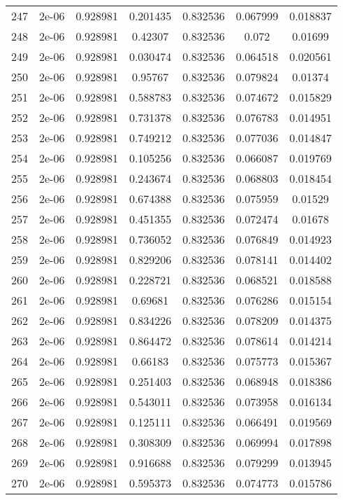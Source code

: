 \begin{table}
\begin{tabular*}{\linewidth}{c|c|c|c|c|c|c}
247 & 2e-06 & 0.928981 & 0.201435 & 0.832536 & 0.067999 & 0.018837\\
248 & 2e-06 & 0.928981 & 0.42307 & 0.832536 & 0.072 & 0.01699\\
249 & 2e-06 & 0.928981 & 0.030474 & 0.832536 & 0.064518 & 0.020561\\
250 & 2e-06 & 0.928981 & 0.95767 & 0.832536 & 0.079824 & 0.01374\\
251 & 2e-06 & 0.928981 & 0.588783 & 0.832536 & 0.074672 & 0.015829\\
252 & 2e-06 & 0.928981 & 0.731378 & 0.832536 & 0.076783 & 0.014951\\
253 & 2e-06 & 0.928981 & 0.749212 & 0.832536 & 0.077036 & 0.014847\\
254 & 2e-06 & 0.928981 & 0.105256 & 0.832536 & 0.066087 & 0.019769\\
255 & 2e-06 & 0.928981 & 0.243674 & 0.832536 & 0.068803 & 0.018454\\
256 & 2e-06 & 0.928981 & 0.674388 & 0.832536 & 0.075959 & 0.01529\\
257 & 2e-06 & 0.928981 & 0.451355 & 0.832536 & 0.072474 & 0.01678\\
258 & 2e-06 & 0.928981 & 0.736052 & 0.832536 & 0.076849 & 0.014923\\
259 & 2e-06 & 0.928981 & 0.829206 & 0.832536 & 0.078141 & 0.014402\\
260 & 2e-06 & 0.928981 & 0.228721 & 0.832536 & 0.068521 & 0.018588\\
261 & 2e-06 & 0.928981 & 0.69681 & 0.832536 & 0.076286 & 0.015154\\
262 & 2e-06 & 0.928981 & 0.834226 & 0.832536 & 0.078209 & 0.014375\\
263 & 2e-06 & 0.928981 & 0.864472 & 0.832536 & 0.078614 & 0.014214\\
264 & 2e-06 & 0.928981 & 0.66183 & 0.832536 & 0.075773 & 0.015367\\
265 & 2e-06 & 0.928981 & 0.251403 & 0.832536 & 0.068948 & 0.018386\\
266 & 2e-06 & 0.928981 & 0.543011 & 0.832536 & 0.073958 & 0.016134\\
267 & 2e-06 & 0.928981 & 0.125111 & 0.832536 & 0.066491 & 0.019569\\
268 & 2e-06 & 0.928981 & 0.308309 & 0.832536 & 0.069994 & 0.017898\\
269 & 2e-06 & 0.928981 & 0.916688 & 0.832536 & 0.079299 & 0.013945\\
270 & 2e-06 & 0.928981 & 0.595373 & 0.832536 & 0.074773 & 0.015786\\
\end{tabular*}
\end{table}
